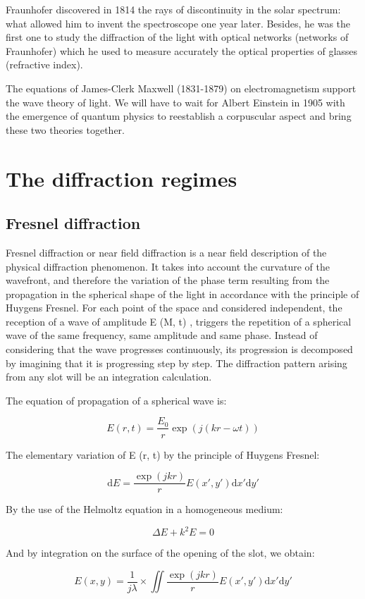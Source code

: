 \documentclass[10pt,a4paper]{article}
\begin{document}
Fraunhofer discovered in 1814 the rays of discontinuity in the solar spectrum: what allowed him to invent the spectroscope one year later. Besides, he was the first one to study the diffraction of the light with optical networks (networks of Fraunhofer) which he used to measure accurately the optical properties of glasses (refractive index). 

The equations of James-Clerk Maxwell (1831-1879) on electromagnetism support the wave theory of light. We will have to wait for Albert Einstein in 1905 with the emergence of quantum physics to reestablish a corpuscular aspect and bring these two theories together.

\section{The diffraction regimes}
	\subsection{Fresnel diffraction}
Fresnel diffraction or near field diffraction is a near field description of the physical diffraction phenomenon. It takes into account the curvature of the wavefront, and therefore the variation of the phase term resulting from the propagation in the spherical shape of the light in accordance with the principle of Huygens Fresnel. For each point of the space and considered independent, the reception of a wave of amplitude E (M, t) , triggers the repetition of a spherical wave of the same frequency, same amplitude and same phase. Instead of considering that the wave progresses continuously, its progression is decomposed by imagining that it is progressing step by step. The diffraction pattern arising from any slot will be an integration calculation. 

The equation of propagation of a spherical wave is:

\[E(r,t)= \frac{E_0}{r} \exp\left(j(kr-\omega t)\right)\]

The elementary variation of E (r, t) by the principle of Huygens Fresnel:

\[\mathrm{d}E=\frac{\exp\left(jkr\right)}{r} E(x',y') \mathrm{d}x' \mathrm{d}y'\]

By the use of the Helmoltz equation in a homogeneous medium: 

\[\Delta E+k^2 E=0\]

And by integration on the surface of the opening of the slot, we obtain:

\[
E(x,y)=\frac{1}{j\lambda}
\times \iint \frac{\exp\left(jkr\right)}{r}
E(x',y')\mathrm{d}x'\mathrm{d}y'
\]
\end{document}
